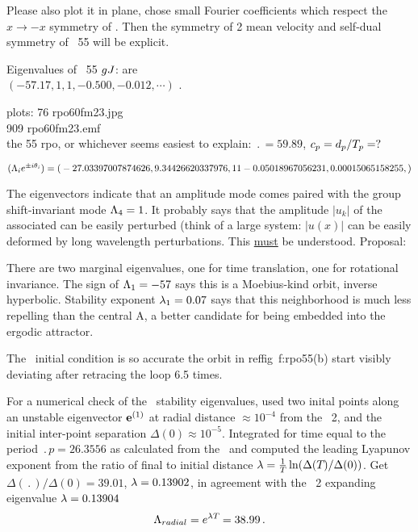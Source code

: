 Please also plot it in plane, chose small Fourier coefficients
 which respect the $x \to -x$ symmetry of \KSe.
Then the symmetry of 2 mean velocity
{\eqva} and self-dual symmetry of \rpo\ {\nameit}55 will be explicit.

Eigenvalues of \rpo\ {\nameit}55 $g\jMps$: are
\\
$(-57.17,  1, 1, -0.500, -0.012, \cdots)$ .
%

plots:
  76 rpo60fm23.jpg  \\
 909 rpo60fm23.emf  \\
the 55 rpo, or whichever seems easiest to explain:
$\period{} = 59.89$,
$c_p = \shift_p/\period{p}= ?$

$(\ExpaEig_i e^{\pm i\theta_i})=
(
\\
 -27.03397007874626,
\\
   9.34426620337976,
\\
   1
\\
   1
\\
  -0.05018967056231,
\\
   0.00015065158255,
)$

The eigenvectors
indicate that an amplitude mode comes paired with the
group shift-invariant mode $\ExpaEig_4 =1$. It probably says that
the amplitude $|u_k|$ of the associated can be easily perturbed (think of
a large system: $|u(x)|$ can be easily deformed by long wavelength
perturbations. This \underline{must} be understood. Proposal:

There are two
marginal eigenvalues, one for time translation, one for
rotational invariance.
The sign of $\ExpaEig_{1}=-57$ says this is a Moebius-kind orbit,
inverse hyperbolic.
Stability exponent
 $\eigExp[1]=0.07$ says that this neighborhood is much less repelling than
the central {\eqv} A, a better candidate for being embedded into the
ergodic attractor.

The \rpo\ initial condition is
so accurate the orbit in reffig~{f:rpo55}(b)
start visibly deviating after retracing the loop 6.5 times.

For a numerical check of the \rpo\ stability eigenvalues,
used two inital
points along an unstable eigenvector $\jEigvec{1}$
at radial distance  $\approx 10^{-4}$ from the \eqv\ {\nameit}2,
and the initial inter-point separation $\Delta(0) \approx 10^{-5}$.
Integrated for time equal to the period $\period{p}=26.3556$ as calculated from
the \jacobianM\ and computed the leading Lyapunov exponent from the ratio of
final to initial distance
$\Lyap= \frac{1 }{ \period{}}\ln( \Delta(\period{})/\Delta(0))$.
Get
$\Delta(\period{})/\Delta(0) =39.01$,
$\Lyap=0.13902$, in agreement with the \eqv\ {\nameit}2
expanding eigenvalue $\Lyap=0.13904$
\[
\ExpaEig_{radial} =  e^{\Lyap \period{}} =38.99
\,.
\]

